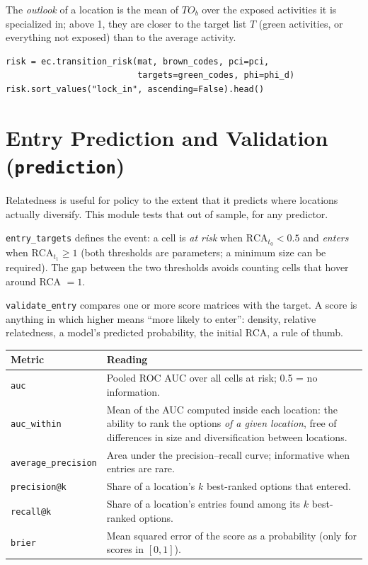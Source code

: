\documentclass[12pt, a4paper]{article}
\newcommand{\fn}[1]{\texttt{#1}}
\begin{document}
The \emph{outlook} of a location is the mean of $TO_b$ over the exposed
activities it is specialized in; above 1, they are closer to the target
list $T$ (green activities, or everything not exposed) than to the
average activity.

\begin{lstlisting}[caption={Exposure, lock-in and transition outlook}]
risk = ec.transition_risk(mat, brown_codes, pci=pci,
                          targets=green_codes, phi=phi_d)
risk.sort_values("lock_in", ascending=False).head()
\end{lstlisting}

\section{Entry Prediction and Validation (\texttt{prediction})}

Relatedness is useful for policy to the extent that it predicts where
locations actually diversify. This module tests that out of sample, for
any predictor.

\fn{entry\_targets} defines the event: a cell is \emph{at risk} when
$\text{RCA}_{t_0} < 0.5$ and \emph{enters} when $\text{RCA}_{t_1} \geq 1$
(both thresholds are parameters; a minimum size can be required). The gap
between the two thresholds avoids counting cells that hover around
RCA $= 1$.

\fn{validate\_entry} compares one or more score matrices with the
target. A score is anything in which higher means ``more likely to
enter'': density, relative relatedness, a model's predicted probability,
the initial RCA, a rule of thumb.

\begin{center}
\renewcommand{\arraystretch}{1.25}
\small
\begin{tabular}{l>{\raggedright\arraybackslash}p{10.5cm}}
\toprule
\textbf{Metric} & \textbf{Reading} \\
\midrule
\texttt{auc} & Pooled ROC AUC over all cells at risk; 0.5 = no information. \\
\texttt{auc\_within} & Mean of the AUC computed inside each location: the
  ability to rank the options \emph{of a given location}, free of
  differences in size and diversification between locations. \\
\texttt{average\_precision} & Area under the precision--recall curve;
  informative when entries are rare. \\
\texttt{precision@k} & Share of a location's $k$ best-ranked options that
  entered. \\
\texttt{recall@k} & Share of a location's entries found among its $k$
  best-ranked options. \\
\texttt{brier} & Mean squared error of the score as a probability
  (only for scores in $[0,1]$). \\
\bottomrule
\end{tabular}
\end{center}
\end{document}
